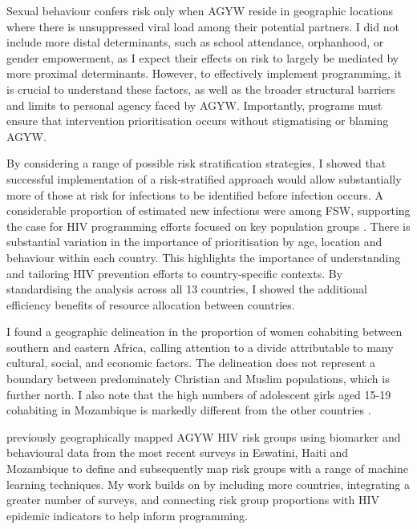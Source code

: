 \documentclass[a4paper, nobind]{templates/ociamthesis}
\begin{document}
Sexual behaviour confers risk only when AGYW reside in geographic locations where there is unsuppressed viral load among their potential partners.
I did not include more distal determinants, such as school attendance, orphanhood, or gender empowerment, as I expect their effects on risk to largely be mediated by more proximal determinants.
However, to effectively implement programming, it is crucial to understand these factors, as well as the broader structural barriers and limits to personal agency faced by AGYW.
Importantly, programs must ensure that intervention prioritisation occurs without stigmatising or blaming AGYW.

By considering a range of possible risk stratification strategies, I showed that successful implementation of a risk-stratified approach would allow substantially more of those at risk for infections to be identified before infection occurs.
A considerable proportion of estimated new infections were among FSW, supporting the case for HIV programming efforts focused on key population groups \autocite{baral2012burden}.
There is substantial variation in the importance of prioritisation by age, location and behaviour within each country.
This highlights the importance of understanding and tailoring HIV prevention efforts to country-specific contexts.
By standardising the analysis across all 13 countries, I showed the additional efficiency benefits of resource allocation between countries.

I found a geographic delineation in the proportion of women cohabiting between southern and eastern Africa, calling attention to a divide attributable to many cultural, social, and economic factors.
The delineation does not represent a boundary between predominately Christian and Muslim populations, which is further north.
I also note that the high numbers of adolescent girls aged 15-19 cohabiting in Mozambique is markedly different from the other countries \autocite{unicef}.

\textcite{brugh2021characterizing} previously geographically mapped AGYW HIV risk groups using biomarker and behavioural data from the most recent surveys in Eswatini, Haiti and Mozambique to define and subsequently map risk groups with a range of machine learning techniques.
My work builds on \textcite{brugh2021characterizing} by including more countries, integrating a greater number of surveys, and connecting risk group proportions with HIV epidemic indicators to help inform programming.
\end{document}
